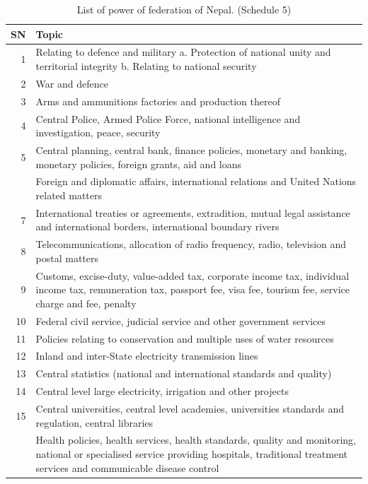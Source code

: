 \documentclass[
  openany]{book}
\begin{document}
\begin{longtable}[t]{r>{\raggedright\arraybackslash}p{35em}}
\caption{\label{tab:power-division-federation}List of power of federation of Nepal. (Schedule 5)}\\
\toprule
SN & Topic\\
\midrule
\rowcolor{gray!6}  1 & Relating to defence and military a. Protection of national unity and territorial integrity b. Relating to national security\\
2 & War and defence\\
\rowcolor{gray!6}  3 & Arms and ammunitions factories and production thereof\\
4 & Central Police, Armed Police Force, national intelligence and investigation, peace, security\\
\rowcolor{gray!6}  5 & Central planning, central bank, finance policies, monetary and banking, monetary policies, foreign grants, aid and loans\\
\addlinespace
6 & Foreign and diplomatic affairs, international relations and United Nations related matters\\
\rowcolor{gray!6}  7 & International treaties or agreements, extradition, mutual legal assistance and international borders, international boundary rivers\\
8 & Telecommunications, allocation of radio frequency, radio, television and postal matters\\
\rowcolor{gray!6}  9 & Customs, excise-duty, value-added tax, corporate income tax, individual income tax, remuneration tax, passport fee, visa fee, tourism fee, service charge and fee, penalty\\
10 & Federal civil service, judicial service and other government services\\
\addlinespace
\rowcolor{gray!6}  11 & Policies relating to conservation and multiple uses of water resources\\
12 & Inland and inter-State electricity transmission lines\\
\rowcolor{gray!6}  13 & Central statistics (national and international standards and quality)\\
14 & Central level large electricity, irrigation and other projects\\
\rowcolor{gray!6}  15 & Central universities, central level academies, universities standards and regulation, central libraries\\
\addlinespace
16 & Health policies, health services, health standards, quality and monitoring, national or specialised service providing hospitals, traditional treatment services and communicable disease control\\

\end{longtable}
\end{document}
